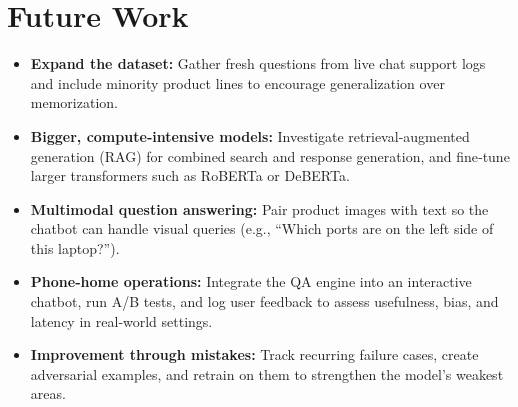 \documentclass[10pt,conference]{IEEEtran}
\begin{document}
\section{Future Work}
\begin{itemize}
  \item \textbf{Expand the dataset:} Gather fresh questions from live chat support logs and include minority product lines to encourage generalization over memorization.
  
  \item \textbf{Bigger, compute‑intensive models:} Investigate retrieval‑augmented generation (RAG) \cite{8} for combined search and response generation, and fine‑tune larger transformers such as RoBERTa \cite{7} or DeBERTa.
  
  \item \textbf{Multimodal question answering:} Pair product images with text so the chatbot can handle visual queries (e.g., “Which ports are on the left side of this laptop?”).
  
  \item \textbf{Phone‑home operations:} Integrate the QA engine into an interactive chatbot, run A/B tests, and log user feedback to assess usefulness, bias, and latency in real‑world settings.
  
  \item \textbf{Improvement through mistakes:} Track recurring failure cases, create adversarial examples, and retrain on them to strengthen the model’s weakest areas.
\end{itemize}
\end{document}
